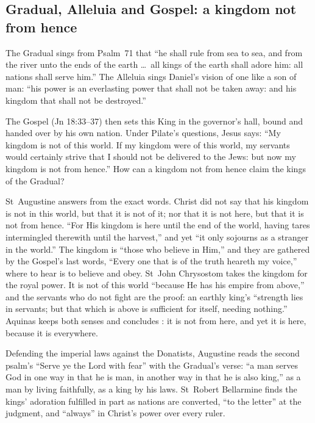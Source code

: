 \subsection{Gradual, Alleluia and Gospel: a kingdom not from hence}

The Gradual sings from Psalm~71 that ``he shall rule from sea to sea, and from
the river unto the ends of the earth \dots\ all kings of the earth shall adore
him: all nations shall serve him.'' The Alleluia sings Daniel's vision of one
like a son of man: ``his power is an everlasting power that shall not be taken
away: and his kingdom that shall not be destroyed.''

The Gospel (Jn 18:33--37) then sets this King in the governor's hall, bound
and handed over by his own nation. Under Pilate's questions, Jesus says: ``My
kingdom is not of this world. If my kingdom were of this world, my servants
would certainly strive that I should not be delivered to the Jews: but now my
kingdom is not from hence.'' How can a kingdom not from hence claim the kings
of the Gradual?

St~Augustine answers from the exact words. Christ did not say that his
kingdom is not in this world, but that it is not of it; nor that it is not
here, but that it is not from hence. ``For His kingdom is here until the end
of the world, having tares intermingled therewith until the harvest,'' and
yet ``it only sojourns as a stranger in the world.'' The kingdom is ``those
who believe in Him,'' and they are gathered by the Gospel's last words,
``Every one that is of the truth heareth my voice,'' where to hear is to
believe and obey. St~John Chrysostom takes the kingdom for the royal power. It
is not of this world ``because He has his empire from above,'' and the
servants who do not fight are the proof: an earthly king's ``strength lies in
servants; but that which is above is sufficient for itself, needing
nothing.'' Aquinas keeps both senses and concludes : it is not from here, and yet it is here,
because it is everywhere.

Defending the imperial laws against the Donatists, Augustine reads the second
psalm's ``Serve ye the Lord with fear'' with the Gradual's verse: ``a man
serves God in one way in that he is man, in another way in that he is also
king,'' as a man by living faithfully, as a king by his laws. St~Robert
Bellarmine finds the kings' adoration fulfilled in part as nations are
converted, ``to the letter'' at the judgment, and ``always'' in Christ's power
over every ruler.

